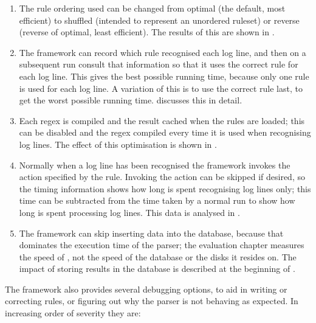 \begin{enumerate}

    \item The rule ordering used can be changed from optimal (the default,
        most efficient) to shuffled (intended to represent an unordered
        ruleset) or reverse (reverse of optimal, least efficient).  The
        results of this are shown in .

    \item The framework can record which rule recognised each log line, and
        then on a subsequent run consult that information so that it uses
        the correct rule for each log line.  This gives the best possible
        running time, because only one rule is used for each log line.  A
        variation of this is to use the correct rule last, to get the worst
        possible running time.  
        discusses this in detail.

    \item Each regex is compiled and the result cached when the rules are
        loaded; this can be disabled and the regex compiled every time it
        is used when recognising log lines.  The effect of this
        optimisation is shown in .

    \item Normally when a log line has been recognised the framework
        invokes the action specified by the rule.  Invoking the action can
        be skipped if desired, so the timing information shows how long is
        spent recognising log lines only; this time can be subtracted from
        the time taken by a normal run to show how long is spent processing
        log lines.  This data is analysed in .

    \item The framework can skip inserting data into the database, because
        that dominates the execution time of the parser; the evaluation
        chapter measures the speed of \parsername{}, not the speed of the
        database or the disks it resides on.  The impact of storing results
        in the database is described at the beginning of
        .

\end{enumerate}

The framework also provides several debugging options, to aid in writing or
correcting rules, or figuring out why the parser is not behaving as
expected.  In increasing order of severity they are:

